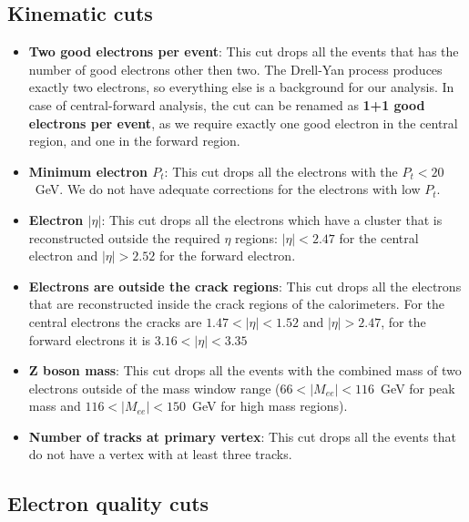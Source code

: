 \subsection{Kinematic cuts}
\label{sec:Sel_kinematic}

\begin{itemize}
\item {\bfseries Two good electrons per event}: This cut drops all the events that has the number of good electrons other then two. The Drell-Yan process produces exactly two electrons, so everything else is a background for our analysis. In case of central-forward analysis, the cut can be renamed as {\bfseries 1+1 good electrons per event}, as we require exactly one good electron in the central region, and one in the forward region.
\item {\bfseries Minimum electron $P_{t}$}: This cut drops all the electrons with the $P_{t} < 20$~GeV. We do not have adequate corrections for the electrons with low $P_{t}$.
\item {\bfseries Electron $|\eta|$}: This cut drops all the electrons which have a cluster that is reconstructed outside the required $\eta$ regions: $|\eta| < 2.47$ for the central electron and $|\eta| > 2.52$ for the forward electron.
\item {\bfseries Electrons are outside the crack regions}: This cut drops all the electrons that are reconstructed inside the crack regions of the calorimeters. For the central electrons the cracks are $1.47 < |\eta| < 1.52$ and $|\eta| > 2.47$, for the forward electrons it is $3.16 < |\eta| < 3.35$
\item {\bfseries Z boson mass}: This cut drops all the events with the combined mass of two electrons outside of the mass window range ($66 < |M_{ee}| < 116$~GeV for peak mass and $116 < |M_{ee}| < 150$~GeV for high mass regions).
\item {\bfseries Number of tracks at primary vertex}: This cut drops all the events that do not have a vertex with at least three tracks.
\end{itemize}

\subsection{Electron quality cuts}
\label{sec:Sel_isem_iso}

